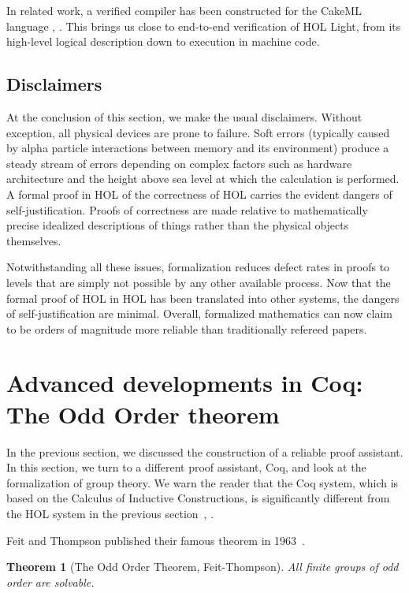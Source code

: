 \documentclass[brochure,english,12pt]{bourbaki}
\theoremstyle{plain}
\newtheorem{theorem}[equation]{Theorem}
\begin{document}
In related work, a verified compiler has been constructed for the
CakeML language \cite{CakeML}, \cite{sarkar2009semantics}.  This
brings us close to end-to-end verification of HOL Light, from its
high-level logical description down to execution in machine code.



\subsection{Disclaimers}

At the conclusion of this section, we make the usual disclaimers.
Without exception, all physical devices are prone to failure.  Soft
errors (typically caused by alpha particle interactions between memory
and its environment) produce a steady stream of errors depending on
complex factors such as hardware architecture and the height above sea
level at which the calculation is performed.  A formal proof in HOL of
the correctness of HOL carries the evident dangers of
self-justification.  Proofs of correctness are made relative to
mathematically precise idealized descriptions of things rather than
the physical objects themselves.

Notwithstanding all these issues, formalization reduces defect rates
in proofs to levels that are simply not possible by any other
available process.  Now that the formal proof of HOL in HOL has been
translated into other systems, the dangers of self-justification are
minimal.  Overall, formalized mathematics can now claim to be
orders of magnitude more reliable than traditionally refereed papers.



\section{Advanced developments in Coq: The Odd Order theorem}

In the previous section, we discussed the construction of a reliable
proof assistant.  In this section, we turn to a different proof
assistant, Coq, and look at the formalization of group theory.  We
warn the reader that the Coq system, which is based on the Calculus of
Inductive Constructions, is significantly different from the HOL
system in the previous section~\cite{Coq2014}, \cite{CiC}.

\bigskip

Feit and Thompson published their famous theorem in 1963~\cite{FT}.

\begin{theorem}[The Odd Order Theorem, Feit-Thompson]  All finite groups of odd order are solvable.
\end{theorem}
\end{document}
